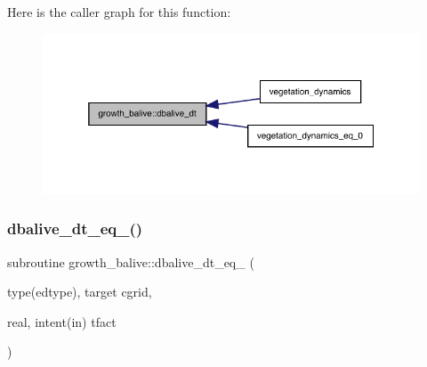 Here is the caller graph for this function\+:
\nopagebreak
\begin{figure}[H]
\begin{center}
\leavevmode
\includegraphics[width=325pt]{namespacegrowth__balive_a7781ae229b2399c90d50858382665ee8_icgraph}
\end{center}
\end{figure}
\mbox{\label{namespacegrowth__balive_a15cba39e9b70b8dd6a1e2d0cbdd5cc2e}} 
\subsubsection{\texorpdfstring{dbalive\+\_\+dt\+\_\+eq\+\_()}{dbalive\_dt\_eq\_0()}}
{\footnotesize\ttfamily subroutine growth\+\_\+balive\+::dbalive\+\_\+dt\+\_\+eq\+\_ (\begin{DoxyParamCaption}\item[{type(edtype), target}]{cgrid,  }\item[{real, intent(in)}]{tfact }\end{DoxyParamCaption})}

